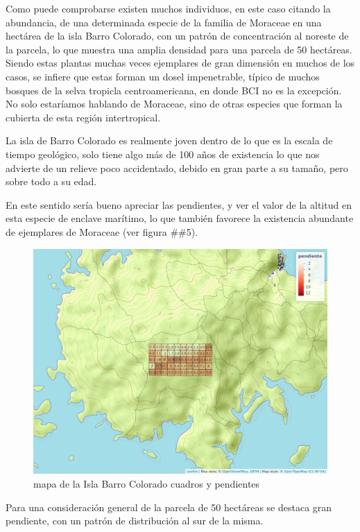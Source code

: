 \documentclass[11pt,]{article}
\begin{document}
Como puede comprobarse existen muchos individuos, en este caso citando
la abundancia, de una determinada especie de la familia de Moraceae en
una hectárea de la isla Barro Colorado, con un patrón de concentración
al noreste de la parcela, lo que muestra una amplia densidad para una
parcela de 50 hectáreas. Siendo estas plantas muchas veces ejemplares de
gran dimensión en muchos de los casos, se infiere que estas forman un
dosel impenetrable, típico de muchos bosques de la selva tropicla
centroamericana, en donde BCI no es la excepción. No solo estaríamos
hablando de Moraceae, sino de otras especies que forman la cubierta de
esta región intertropical.

La isla de Barro Colorado es realmente joven dentro de lo que es la
escala de tiempo geológico, solo tiene algo más de 100 años de
existencia lo que nos advierte de un relieve poco accidentado, debido en
gran parte a su tamaño, pero sobre todo a su edad.

En este sentido sería bueno apreciar las pendientes, y ver el valor de
la altitud en esta especie de enclave marítimo, lo que también favorece
la existencia abundante de ejemplares de Moraceae (ver figura \#\#5).

\begin{figure}
\centering
\includegraphics[width=1.00000\textwidth]{mapa_cuadros_pendiente.png}
\caption{mapa de la Isla Barro Colorado cuadros y pendientes
\label{fig:bci_map}}
\end{figure}

Para una consideración general de la parcela de 50 hectáreas se destaca
gran pendiente, con un patrón de distribución al sur de la misma.
\end{document}
